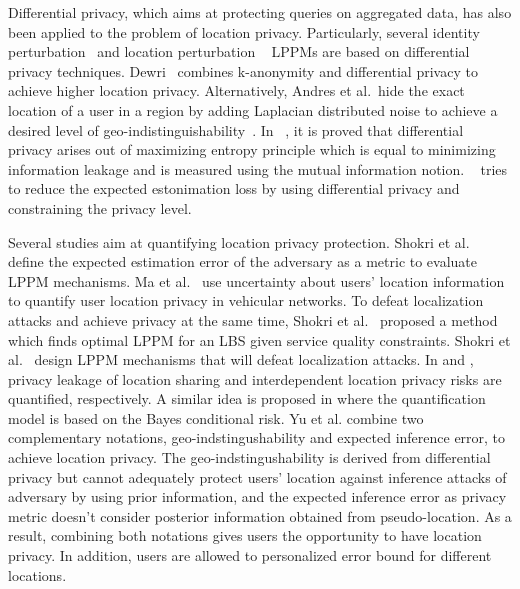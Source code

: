 Differential privacy, which aims at protecting queries on aggregated data, has also been applied to the problem of location privacy.
Particularly, several identity perturbation~\cite{lee2012differential, bordenabe2014optimal, chatzikokolakis2015geo, nguyen2013differential, machanavajjhala2008privacy} and location perturbation ~\cite{chatzikokolakis2013broadening,shokri2014optimal, chatzikokolakis2015location,andres2013geo,bordenabe2014optimal} LPPMs are based on differential privacy techniques.
Dewri~\cite{dewri2013local} combines k-anonymity and differential privacy to achieve higher location privacy. Alternatively, Andres et al.\ hide the exact location of a user in a region by adding Laplacian distributed noise  to achieve a desired level of geo-indistinguishability~\cite{andres2013geo}. In ~\cite{info2012}, it  is proved that differential privacy arises out of maximizing entropy principle which is equal to minimizing information leakage and is measured using the mutual information notion. ~\cite{yeb17} tries to reduce the expected estonimation loss by using differential privacy and constraining the privacy level.




Several studies aim at quantifying location privacy protection.  Shokri et al.~\cite{shokri2011quantifying, shokri2011quantifying2} define the expected estimation error of the adversary  as a metric to evaluate LPPM mechanisms.  Ma et al.~\cite{ma2009location}  use  uncertainty about users' location information to quantify user location privacy in vehicular networks.
To defeat localization attacks and achieve privacy at the same time, Shokri et al.~\cite{shokri2012protecting} proposed a method which finds optimal LPPM for an LBS given service quality constraints. Shokri et al.~\cite{shokri2012protecting} design LPPM mechanisms that will defeat localization attacks.
In \cite{6li2016privacy} and \cite{4olteanu2016quantifying}, privacy leakage of location sharing and interdependent location privacy risks are quantified, respectively. A similar idea is proposed in \cite{14zhang2014privacy} where the quantification model is based on the Bayes conditional risk. Yu et al. \cite{diff2017} combine two complementary notations, geo-indstingushability and expected inference error, to achieve location privacy. The geo-indstingushability is derived from differential privacy but cannot adequately protect users' location against inference attacks of adversary by using prior information, and the expected inference error as privacy metric doesn't consider posterior information obtained from  pseudo-location. As a result, combining both notations gives users the opportunity to have location privacy. In addition, users are allowed to personalized error bound for different locations.

